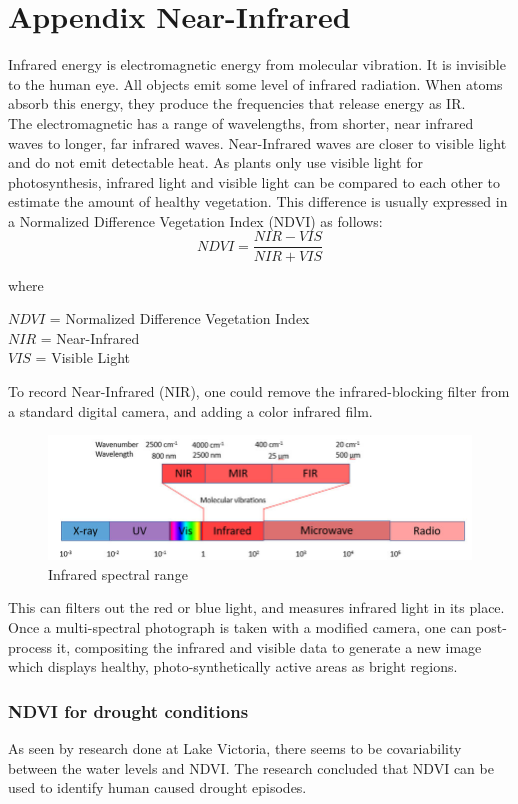 \newpage
\section{Appendix Near-Infrared}
Infrared energy is electromagnetic energy from molecular vibration. It is invisible to the human eye. All objects emit some level of infrared radiation. When atoms absorb this energy, they produce the frequencies that release energy as IR.\\

The electromagnetic has a range of wavelengths, from shorter, near infrared waves to longer, far infrared waves. Near-Infrared waves are closer to visible light and do not emit detectable heat. As plants only use visible light for photosynthesis, infrared light and visible light can be compared to each other to estimate the amount of healthy vegetation. \cite{nasanir} This difference is usually expressed in a Normalized Difference Vegetation Index (NDVI) as follows:\\

\[NDVI = \frac{NIR-VIS}{NIR+VIS}\]

where
\begin{tabbing}
$NDVI$ = Normalized Difference Vegetation Index\\
$NIR$ = Near-Infrared\\
$VIS$ = Visible Light\\
\end{tabbing}

To record Near-Infrared (NIR), one could remove the infrared-blocking filter from a standard digital camera, and adding a color infrared film.

\begin{figure}[h]
\centering
\includegraphics[scale=0.5]{appendix/b1_spectralrange.jpg}
\caption{Infrared spectral range \cite{infraredspectrum}}
\end{figure}

This can filters out the red or blue light, and measures infrared light in its place. Once a multi-spectral photograph is taken with a modified camera, one can post-process it, compositing the infrared and visible data to generate a new image which displays healthy, photo-synthetically active areas as bright regions. \cite{publiclabnir}

\subsubsection*{NDVI for drought conditions}
As seen by research done at Lake Victoria, there seems to be covariability between the water levels and NDVI. \cite{victorialake} The research concluded that NDVI can be used to identify human caused drought episodes.

